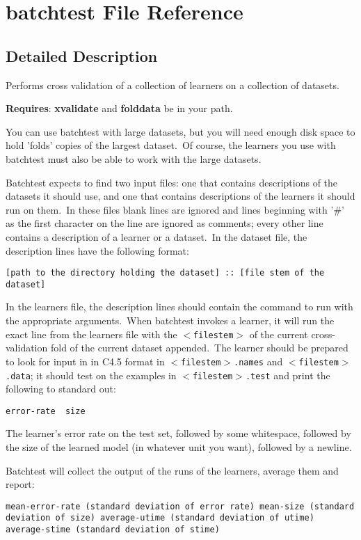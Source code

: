 \section{batchtest File Reference}
\label{batchtest}


\subsection{Detailed Description}
Performs cross validation of a collection of learners on a collection of datasets. 

{\bf Requires}: {\bf xvalidate} and {\bf folddata} be in your path.

You can use batchtest with large datasets, but you will need enough disk space to hold 'folds' copies of the largest dataset.\  Of course, the learners you use with batchtest must also be able to work with the large datasets.

Batchtest expects to find two input files: one that contains descriptions of the datasets it should use, and one that contains descriptions of the learners it should run on them.\  In these files blank lines are ignored and lines beginning with '\#' as the first character on the line are ignored as comments; every other line contains a description of a learner or a dataset.\  In the dataset file, the description lines have the following format:

{\tt [path to the directory holding the dataset] :: [file stem of the dataset]}

In the learners file, the description lines should contain the command to run with the appropriate arguments.\  When batchtest invokes a learner, it will run the exact line from the learners file with the {\tt $<$filestem$>$} of the current cross-validation fold of the current dataset appended.\  The learner should be prepared to look for input in in C4.5 format in {\tt $<$filestem$>$.names} and {\tt $<$filestem$>$.data}; it should test on the examples in {\tt $<$filestem$>$.test} and print the following to standard out:

{\tt error-rate\ \  size}

The learner's error rate on the test set, followed by some whitespace, followed by the size of the learned model (in whatever unit you want), followed by a newline. 

Batchtest will collect the output of the runs of the learners, average them and report:

{\tt mean-error-rate (standard deviation of error rate) mean-size (standard deviation of size) average-utime (standard deviation of utime) average-stime (standard deviation of stime)}


